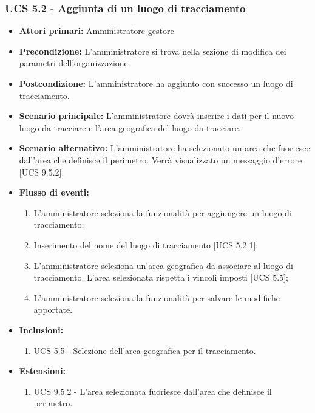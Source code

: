 \subsubsection{UCS 5.2 - Aggiunta di un luogo di tracciamento}%
\begin{itemize}
    \item \textbf{Attori primari:} Amministratore gestore
    \item \textbf{Precondizione:} L'amministratore si trova nella sezione di modifica dei parametri dell'organizzazione.
    \item \textbf{Postcondizione:} L'amministratore ha aggiunto con successo un luogo di tracciamento.
    \item \textbf{Scenario principale:} L'amministratore dovrà inserire i dati per il nuovo luogo da tracciare e l'area geografica del luogo da tracciare.
    \item \textbf{Scenario alternativo:} L'amministratore ha selezionato un area che fuoriesce dall'area che definisce il perimetro. Verrà visualizzato un messaggio d'errore [UCS 9.5.2].
    \item \textbf{Flusso di eventi:}
    \begin{enumerate}     
        \item L'amministratore seleziona la funzionalità per aggiungere un luogo di tracciamento;
        \item Inserimento del nome del luogo di tracciamento [UCS 5.2.1];
        \item L'amministratore seleziona un'area geografica da associare al luogo di tracciamento. L'area selezionata rispetta i vincoli imposti [UCS 5.5]; 
        \item L'amministratore seleziona la funzionalità per salvare le modifiche apportate.
    \end{enumerate}   
    \item \textbf{Inclusioni:}
    \begin{enumerate}
        \item UCS 5.5 - Selezione dell'area geografica per il tracciamento.
    \end{enumerate}
    \item \textbf{Estensioni:}
    \begin{enumerate}
        \item UCS 9.5.2 - L'area selezionata fuoriesce dall'area che definisce il perimetro.
    \end{enumerate}
\end{itemize}

